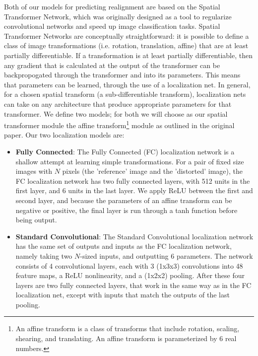 Both of our models for predicting realignment are based on the Spatial Transformer Network, which was originally designed as a tool to regularize convolutional networks and speed up image classification tasks\cite{Jaderberg2015}. Spatial Transformer Networks are conceptually straightforward: it is possible to define a class of image transformations (i.e. rotation, translation, affine) that are at least partially differentiable. If a transformation is at least partially differentiable, then any gradient that is calculated at the output of the transformer can be backpropogated through the transformer and into its parameters. This means that parameters can be learned, through the use of a localization net. In general, for a chosen spatial transform (a sub-differentiable transform), localization nets can take on any architecture that produce appropriate parameters for that transformer. We define two models; for both we will choose as our spatial transformer module the affine transform\footnote{An affine transform is a class of transforms that include rotation, scaling, shearing, and translating. An affine transform is parameterized by 6 real numbers.} module as outlined in the original paper. Our two localization models are:

\begin{itemize}
	\item \textbf{Fully Connected}: The Fully Connected (FC) localization network is a shallow attempt at learning simple transformations. For a pair of fixed size images with $N$ pixels (the 'reference' image and the 'distorted' image), the FC localization network has two fully connected layers, with 512 units in the first layer, and 6 units in the last layer. We apply ReLU between the first and second layer, and because the parameters of an affine transform can be negative or positive, the final layer is run through a tanh function before being output.
	
	\item \textbf{Standard Convolutional}: The Standard Convolutional localization network has the same set of outputs and inputs as the FC localization network, namely taking two $N$-sized inputs, and outputting 6 parameters. The network consists of 4 convolutional layers, each with 3 (1x3x3) convolutions into 48 feature maps, a ReLU nonlinearity, and a (1x2x2) pooling. After these four layers are two fully connected layers, that work in the same way as in the FC localization net, except with inputs that match the outputs of the last pooling. 
\end{itemize}

